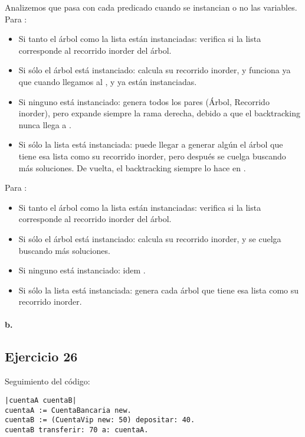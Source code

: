 Analizemos que pasa con cada predicado cuando se instancian o no las variables. Para :

\begin{itemize}
  \item Si tanto el árbol como la lista están instanciadas: verifica si la lista corresponde al recorrido inorder del árbol.
  \item Si sólo el árbol está instanciado: calcula su recorrido inorder, y funciona ya que cuando llegamos al ,  y  ya están instanciadas.
  \item Si ninguno está instanciado: genera todos los pares (Árbol, Recorrido inorder), pero expande siempre la rama derecha, debido a que el backtracking nunca llega a .
  \item Si sólo la lista está instanciada: puede llegar a generar algún el árbol que tiene esa lista como su recorrido inorder, pero después se cuelga buscando más soluciones. De vuelta, el backtracking siempre lo hace en .
\end{itemize}

Para :

\begin{itemize}
  \item Si tanto el árbol como la lista están instanciadas: verifica si la lista corresponde al recorrido inorder del árbol.
  \item Si sólo el árbol está instanciado: calcula su recorrido inorder, y se cuelga buscando más soluciones.
  \item Si ninguno está instanciado: idem .
  \item Si sólo la lista está instanciada: genera cada árbol que tiene esa lista como su recorrido inorder.
\end{itemize}

\paragraph{b.}


\subsection*{Ejercicio 26}

Seguimiento del código:

\begin{verbatim}
|cuentaA cuentaB|
cuentaA := CuentaBancaria new.
cuentaB := (CuentaVip new: 50) depositar: 40.
cuentaB transferir: 70 a: cuentaA.
\end{verbatim}

